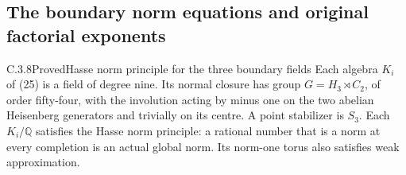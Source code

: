\subsection{The boundary norm equations and original factorial exponents}
\label{sec:ghost-boundary-norms}

\begin{result}{C.3.8}{Proved}{Hasse norm principle for the three boundary fields}
\label{prop:ghost-boundary-hasse-norm}
Each algebra \(K_i\) of (25) is a field of degree nine.
Its normal closure has group
\(G=H_3\rtimes C_2\), of order fifty-four, with
the involution acting by minus one on the two
abelian Heisenberg generators and trivially on its
centre. A point stabilizer is \(S_3\).
Each \(K_i/\mathbb Q\) satisfies the Hasse norm
principle: a rational number that is a norm at
every completion is an actual global norm.
Its norm-one torus also satisfies weak approximation.
\end{result}
